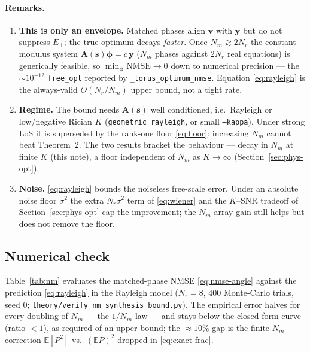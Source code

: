 \paragraph{Remarks.}
\begin{enumerate}
  \item \textbf{This is only an envelope.} Matched phases align $\mathbf{v}$ with $\mathbf{y}$ but do not
    suppress $E_\perp$; the true optimum decays \emph{faster}. Once $N_m\gtrsim 2N_r$ the constant-modulus
    system $\mathbf{A}(\mathbf{s})\boldsymbol{\phi}=c\,\mathbf{y}$ ($N_m$ phases against $2N_r$ real equations)
    is generically feasible, so $\min_{\boldsymbol{\phi}}\mathrm{NMSE}\to0$ down to numerical precision ---
    the $\sim\!10^{-12}$ \texttt{free\_opt} reported by \texttt{\_torus\_optimum\_nmse}. Equation
    \eqref{eq:rayleigh} is the always-valid $O(N_r/N_m)$ upper bound, not a tight rate.
  \item \textbf{Regime.} The bound needs $\mathbf{A}(\mathbf{s})$ well conditioned, i.e.\ Rayleigh or
    low/negative Rician $K$ (\texttt{geometric\_rayleigh}, or small \texttt{--kappa}). Under strong LoS
    it is superseded by the rank-one floor \eqref{eq:floor}: increasing $N_m$ cannot beat Theorem~2.
    The two results bracket the behaviour --- decay in $N_m$ at finite $K$ (this note), a floor
    independent of $N_m$ as $K\to\infty$ (Section~\ref{sec:phys-opt}).
  \item \textbf{Noise.} \eqref{eq:rayleigh} bounds the noiseless free-scale error. Under an absolute noise
    floor $\sigma^2$ the extra $N_r\sigma^2$ term of \eqref{eq:wiener} and the $K$--SNR tradeoff of
    Section~\ref{sec:phys-opt} cap the improvement; the $N_m$ array gain still helps but does not remove
    the floor.
\end{enumerate}

\subsection{Numerical check}

Table~\ref{tab:nm} evaluates the matched-phase NMSE \eqref{eq:nmse-angle} against the prediction
\eqref{eq:rayleigh} in the Rayleigh model ($N_r=8$, $400$ Monte-Carlo trials, seed $0$;
\texttt{theory/verify\_nm\_synthesis\_bound.py}). The empirical error halves for every doubling of
$N_m$ --- the $1/N_m$ law --- and stays below the closed-form curve (ratio $<1$), as required of an
upper bound; the $\approx\!10\%$ gap is the finite-$N_m$ correction $\mathbb{E}[P^2]$ vs.\ $(\mathbb{E}P)^2$
dropped in \eqref{eq:exact-frac}.

